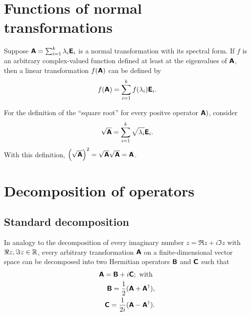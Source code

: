 \section{Functions of normal transformations}

Suppose $\textsf{\textbf{A}}=\sum_{i=1}^k \lambda_i  \textsf{\textbf{E}}_i $ is a normal transformation
with its spectral form.
If $f$ is an arbitrary complex-valued function defined at least at the eigenvalues of $\textsf{\textbf{A}}$,
then a linear transformation  $f(\textsf{\textbf{A}})$ can be defined by
\begin{equation}
f(\textsf{\textbf{A}})=\sum_{i=1}^k f(\lambda_i)  \textsf{\textbf{E}}_i.
\end{equation}

{
\color{blue}
\bexample
For the definition of the ``square root''
for every positve operator $\textsf{\textbf{A}})$, consider
\begin{equation}
\sqrt{\textsf{\textbf{A}}}=\sum_{i=1}^k \sqrt{\lambda_i}  \textsf{\textbf{E}}_i.
\end{equation}
With this definition,
$\left(\sqrt{\textsf{\textbf{A}}}\right)^2=
\sqrt{\textsf{\textbf{A}}}\sqrt{\textsf{\textbf{A}}}= {\textsf{\textbf{A}}}$.
\eexample
}

\section{Decomposition of operators}

\subsection{Standard decomposition}

In analogy to the decomposition of every imaginary number $z= \Re z +i \Im z$ with $\Re z,\Im z\in {\Bbb R}$,
every arbitrary transformation $\textsf{\textbf{A}}$ on a finite-dimensional vector space can be decomposed into two Hermitian operators
$\textsf{\textbf{B}}$
and
$\textsf{\textbf{C}}$
such that
\begin{equation}
\begin{split}
\textsf{\textbf{A}}=\textsf{\textbf{B}} + i \textsf{\textbf{C}}; \textrm{ with }  \\
\textsf{\textbf{B}}=\frac{1}{2}(\textsf{\textbf{A}} +   \textsf{\textbf{A}}^\dagger ), \\
\textsf{\textbf{C}}=\frac{1}{2i}(\textsf{\textbf{A}} -   \textsf{\textbf{A}}^\dagger ).
\end{split}
\end{equation}

